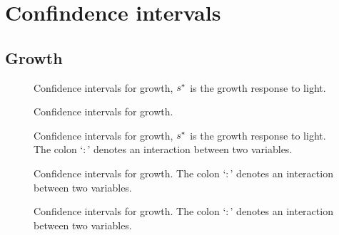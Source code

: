 \section{Confindence intervals} \label{app::confInt}
\subsection{Growth}

\begin{figure}
	\centering
	
	\caption{Confidence intervals for growth, $ {s}^{*} $ is the growth response to light. \label{fig::confInt_g_1}}
\end{figure}
\begin{figure}
	\centering
	
	\caption{Confidence intervals for growth. \label{fig::confInt_g_2}}
\end{figure}
\begin{figure}
	\centering
	
	\caption{Confidence intervals for growth, $ {s}^{*} $ is the growth response to light. The colon `$ : $' denotes an interaction between two variables. \label{fig::confInt_g_3}}
\end{figure}
\begin{figure}
	\centering
	
	\caption{Confidence intervals for growth. The colon `$ : $' denotes an interaction between two variables. \label{fig::confInt_g_4}}
\end{figure}
\begin{figure}
	\centering
	
	\caption{Confidence intervals for growth. The colon `$ : $' denotes an interaction between two variables. \label{fig::confInt_g_5}}
\end{figure}


